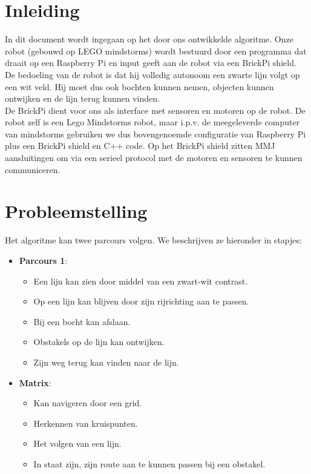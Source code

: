 \documentclass[12pt]{article}
\begin{document}
\newpage

\section{Inleiding}
	In dit document wordt ingegaan op het door ons ontwikkelde algoritme. Onze robot (gebouwd op LEGO mindstorms) wordt bestuurd door een programma dat draait op een Raspberry Pi en input geeft aan de robot via een BrickPi shield.\\
	De bedoeling van de robot is dat hij volledig autonoom een zwarte lijn volgt op een wit veld. Hij moet dus ook bochten kunnen nemen, objecten kunnen ontwijken en de lijn terug kunnen vinden.\\
	De BrickPi dient voor ons als interface met sensoren en motoren op de robot. De robot zelf is een Lego Mindstorms robot, maar i.p.v. de meegeleverde computer van mindstorms gebruiken we dus bovengenoemde configuratie van Raspberry Pi plus een BrickPi shield en C++ code. Op het BrickPi shield zitten MMJ aansluitingen om via een serieel protocol met de motoren en sensoren te kunnen communiceren.
\newpage

\section{Probleemstelling}
	Het algoritme kan twee parcours volgen. We beschrijven ze hieronder in stapjes:
	\begin{itemize}
		\item \textbf{Parcours 1}:
		\begin{itemize}
			\item Een lijn kan zien door middel van een zwart-wit contrast.
			\item Op een lijn kan blijven door zijn rijrichting aan te passen.
			\item Bij een bocht kan afslaan.
			\item Obstakels op de lijn kan ontwijken.
			\item Zijn weg terug kan vinden naar de lijn.
		\end{itemize}
		\item \textbf{Matrix}:
		\begin{itemize}
			\item Kan navigeren door een grid.
			\item Herkennen van kruispunten.
			\item Het volgen van een lijn.
			\item In staat zijn, zijn route aan te kunnen passen bij een obstakel.
		\end{itemize}
	\end{itemize}
\newpage
\end{document}
